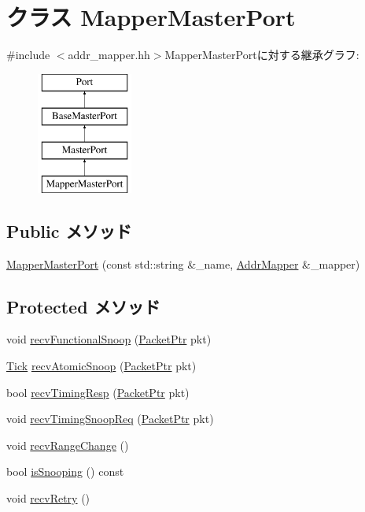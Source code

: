 \hypertarget{classAddrMapper_1_1MapperMasterPort}{
\section{クラス MapperMasterPort}
\label{classAddrMapper_1_1MapperMasterPort}
}


{\ttfamily \#include $<$addr\_\-mapper.hh$>$}MapperMasterPortに対する継承グラフ:\begin{figure}[H]
\begin{center}
\leavevmode
\includegraphics[height=4cm]{classAddrMapper_1_1MapperMasterPort}
\end{center}
\end{figure}
\subsection*{Public メソッド}
\begin{DoxyCompactItemize}
\item 
\hyperlink{classAddrMapper_1_1MapperMasterPort_af25f3129245e33f5b2d5480811ce14c3}{MapperMasterPort} (const std::string \&\_\-name, \hyperlink{classAddrMapper_1_1AddrMapper}{AddrMapper} \&\_\-mapper)
\end{DoxyCompactItemize}
\subsection*{Protected メソッド}
\begin{DoxyCompactItemize}
\item 
void \hyperlink{classAddrMapper_1_1MapperMasterPort_a284dfb90c168233c9d416bc07de8fefe}{recvFunctionalSnoop} (\hyperlink{classPacket}{PacketPtr} pkt)
\item 
\hyperlink{base_2types_8hh_a5c8ed81b7d238c9083e1037ba6d61643}{Tick} \hyperlink{classAddrMapper_1_1MapperMasterPort_a886d584c81ee4e398ff8069907f6e1a5}{recvAtomicSnoop} (\hyperlink{classPacket}{PacketPtr} pkt)
\item 
bool \hyperlink{classAddrMapper_1_1MapperMasterPort_a482dba5588f4bee43e498875a61e5e0b}{recvTimingResp} (\hyperlink{classPacket}{PacketPtr} pkt)
\item 
void \hyperlink{classAddrMapper_1_1MapperMasterPort_aff3031c56fc4947a19695c868bb8233e}{recvTimingSnoopReq} (\hyperlink{classPacket}{PacketPtr} pkt)
\item 
void \hyperlink{classAddrMapper_1_1MapperMasterPort_aecf310a01b533ae8700eccac2cf20480}{recvRangeChange} ()
\item 
bool \hyperlink{classAddrMapper_1_1MapperMasterPort_a5ce11b7a254d3cb756d94568f7cbc25d}{isSnooping} () const 
\item 
void \hyperlink{classAddrMapper_1_1MapperMasterPort_a29cb5a4f98063ce6e9210eacbdb35298}{recvRetry} ()
\end{DoxyCompactItemize}
